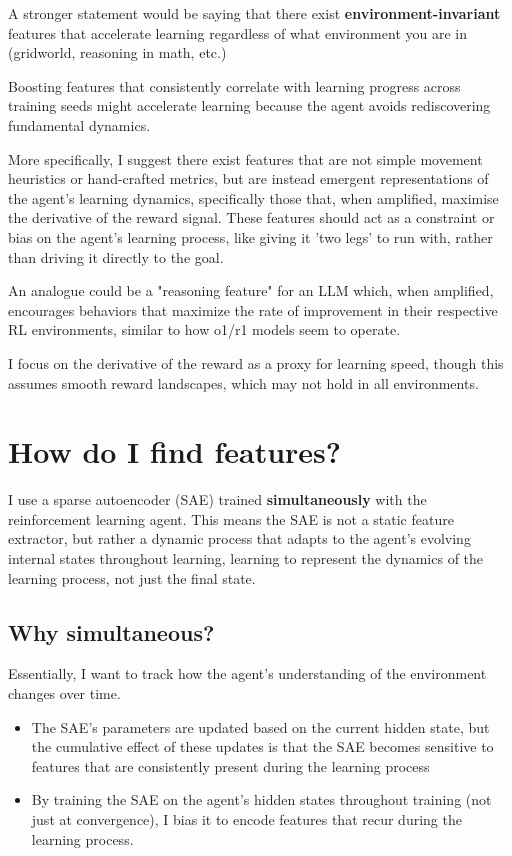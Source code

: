 \documentclass{article}
\begin{document}
A stronger statement would be saying that there exist \textbf{environment-invariant} features that accelerate learning regardless of what environment you are in (gridworld, reasoning in math, etc.)

Boosting features that consistently correlate with learning progress across training seeds might accelerate learning because the agent avoids rediscovering fundamental dynamics.

More specifically, I suggest there exist features that are not simple movement heuristics or hand-crafted metrics, but are instead emergent representations of the agent's learning dynamics, specifically those that, when amplified, maximise the derivative of the reward signal. These features should act as a constraint or bias on the agent's learning process, like giving it 'two legs' to run with, rather than driving it directly to the goal.

An analogue could be a "reasoning feature" for an LLM which, when amplified, encourages behaviors that maximize the rate of improvement in their respective RL environments, similar to how o1/r1 models seem to operate.

I focus on the derivative of the reward as a proxy for learning speed, though this assumes smooth reward landscapes, which may not hold in all environments.
\section{How do I find features?}

I use a sparse autoencoder (SAE) trained \textbf{simultaneously} with the reinforcement learning agent. This means the SAE is not a static feature extractor, but rather a dynamic process that adapts to the agent's evolving internal states throughout learning, learning to represent the dynamics of the learning process, not just the final state.

\subsection{Why simultaneous?}
Essentially, I want to track how the agent's understanding of the environment changes over time.
\begin{itemize}
    \item The SAE's parameters are updated based on the current hidden state, but the cumulative effect of these updates is that the SAE becomes sensitive to features that are consistently present during the learning process
    \item By training the SAE on the agent’s hidden states throughout training (not just at convergence), I bias it to encode features that recur during the learning process.
\end{itemize}
\end{document}
